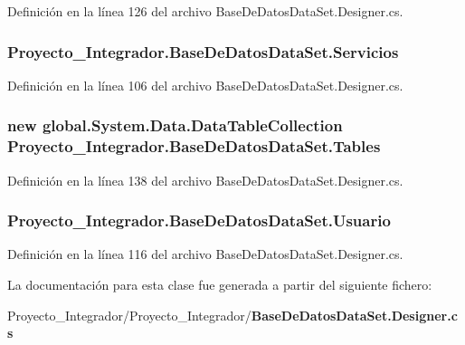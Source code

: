 Definición en la línea 126 del archivo Base\-De\-Datos\-Data\-Set.\-Designer.\-cs.

\subsubsection[{Servicios}]{ Proyecto\-\_\-\-Integrador.\-Base\-De\-Datos\-Data\-Set.\-Servicios\hspace{0.3cm}{\ttfamily [get]}}\label{class_proyecto___integrador_1_1_base_de_datos_data_set_a30d104861c757ec8a34cd18c4202b146}


Definición en la línea 106 del archivo Base\-De\-Datos\-Data\-Set.\-Designer.\-cs.

\subsubsection[{Tables}]{\setlength{\rightskip}{0pt plus 5cm}new global.\-System.\-Data.\-Data\-Table\-Collection Proyecto\-\_\-\-Integrador.\-Base\-De\-Datos\-Data\-Set.\-Tables\hspace{0.3cm}{\ttfamily [get]}}\label{class_proyecto___integrador_1_1_base_de_datos_data_set_ab8f17e5236925d89e57376dac939dac3}


Definición en la línea 138 del archivo Base\-De\-Datos\-Data\-Set.\-Designer.\-cs.

\subsubsection[{Usuario}]{ Proyecto\-\_\-\-Integrador.\-Base\-De\-Datos\-Data\-Set.\-Usuario\hspace{0.3cm}{\ttfamily [get]}}\label{class_proyecto___integrador_1_1_base_de_datos_data_set_a399c0c70d86e58b3099c421853e58350}


Definición en la línea 116 del archivo Base\-De\-Datos\-Data\-Set.\-Designer.\-cs.



La documentación para esta clase fue generada a partir del siguiente fichero\-:\begin{DoxyCompactItemize}
\item 
Proyecto\-\_\-\-Integrador/\-Proyecto\-\_\-\-Integrador/{\bf Base\-De\-Datos\-Data\-Set.\-Designer.\-cs}\end{DoxyCompactItemize}
